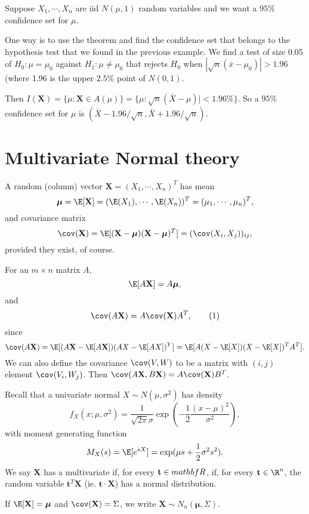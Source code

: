 \documentclass[a4paper]{article}
\begin{document}
\begin{eg}
  Suppose $X_1, \cdots, X_n$ are iid $N(\mu, 1)$ random variables and we want a $95\%$ confidence set for $\mu$.

  One way is to use the theorem and find the confidence set that belongs to the hypothesis test that we found in the previous example. We find a test of size 0.05 of $H_0 : \mu= \mu_0$ against $H_1: \mu\not= \mu_0$ that rejects $H_0$ when $|\sqrt{n}(\bar x - \mu_0)| > 1.96$ (where 1.96 is the upper $2.5\%$ point of $N(0, 1)$.

  Then $I(\mathbf{X}) = \{\mu: \mathbf{X}\in A(\mu)\} = \{\mu:\sqrt{n}(\bar X - \mu)| < 1.96\%\}$. So a $95\%$ confidence set for $\mu$ is $(\bar X - 1.96/\sqrt{n}, \bar X + 1.96/\sqrt{n})$.
\end{eg}
\section{Multivariate Normal theory}
A random (column) vector $\mathbf{X} = (X_1, \cdots, X_n)^T$ has mean
\[
  \boldsymbol\mu = \E[\mathbf{X}] = (\E(X_1), \cdots, \E(X_n))^T = (\mu_1, \cdots, \mu_n)^T,
\]
and covariance matrix
\[
  \cov (\mathbf{X}) = \E[(\mathbf{X} - \boldsymbol\mu)(\mathbf{X} - \boldsymbol\mu)^T] = (\cov(X_i, X_j))_{ij},
\]
provided they exist, of course.

For an $m\times n$ matrix $A$,
\[
  \E[A\mathbf{X}] = A\boldsymbol\mu,
\]
and
\[
  \cov (A\mathbf{X}) = A\cov(\mathbf{X})A^T,\tag{1}
\]
since
\[
  \cov(A\mathbf{X}) = \E[(A\mathbf{X} -\E[A\mathbf{X}])(AX - \E[AX])^Y] = \E[A(X - \E[X])(X - \E[X])^T A^T].
\]
We can also define the covariance $\cov(V, W)$ to be a matrix with $(i, j)$ element $\cov(V_i, W_j)$. Then $\cov(A\mathbf{X}, B\mathbf{X}) = A\cov (\mathbf{X}) B^T$.

Recall that a univariate normal $X\sim N(\mu, \sigma^2)$ has density
\[
  f_X(x; \mu, \sigma^2) = \frac{1}{\sqrt{2\pi}\sigma} \exp\left(-\frac{1}{2}\frac{(x - \mu)^2}{\sigma^2}\right),
\]
with moment generating function
\[
  M_X(s) = \E[e^{sX}] = \exp(\mu s + \frac{1}{2}\sigma^2 s^2).
\]
We say $\mathbf{X}$ has a multivariate if, for every $\mathbf{t}\in \\mathbf{R}$, if, for every $\mathbf{t}\in \R^n$, the random variable $\mathbf{t}^T\mathbf{X}$ (ie. $\mathbf{t}\cdot \mathbf{X}$) has a normal distribution.

If $\E[\mathbf{X}] = \boldsymbol\mu$ and $\cov (\mathbf{X}) = \Sigma$, we write $\mathbf{X}\sim N_n(\boldsymbol\mu, \Sigma)$.
\end{document}
